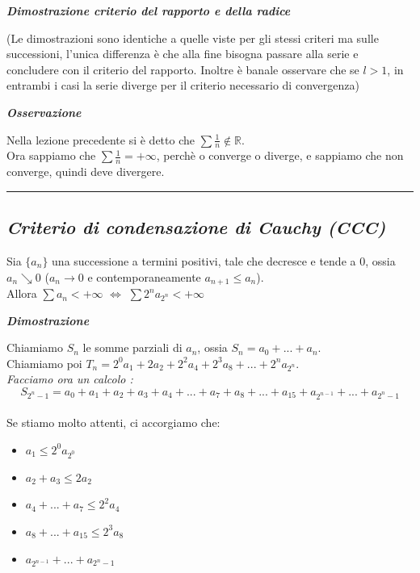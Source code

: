 \documentclass{article}
\theoremstyle{definition}
\newcommand{\R}{\mathbb{R}}
\begin{document}
\begin{center}
    \textbf{\textit{Dimostrazione criterio del rapporto e della radice}}
\end{center}
(Le dimostrazioni sono identiche a quelle viste per gli stessi criteri ma sulle successioni, l'unica differenza è che alla fine bisogna passare alla serie e concludere con il criterio del rapporto. Inoltre è banale osservare che se $l > 1$, in entrambi i casi la serie diverge per il criterio necessario di convergenza)
\\
\begin{center}
    \textbf{\textit{Osservazione}}
\end{center}
Nella lezione precedente si è detto che $\sum \frac{1}{n} \notin \R$.
\\
Ora sappiamo che $\sum \frac{1}{n} = +\infty$, perchè o converge o diverge, e sappiamo che non converge, quindi deve divergere.
\\
\vspace{15pt}
\hrule
\vspace{15pt}
\begin{center}
\subsection{\textbf{\textit{Criterio di condensazione di Cauchy (CCC)}}}
\end{center}
Sia $\{a_n\}$ una successione a termini positivi, tale che decresce e tende a 0, ossia $a_n \searrow 0$ ($a_n \to 0$ e contemporaneamente $a_{n+1} \leqslant a_n$).
\\
Allora $\sum a_n < +\infty \,\, \Longleftrightarrow \,\, \sum 2^na_{2^n} < +\infty$
\begin{center}
    \textbf{\textit{Dimostrazione}}
\end{center}
Chiamiamo $S_n$ le somme parziali di $a_n$, ossia $S_n=a_0+...+a_n$.
\\
Chiamiamo poi $T_n=2^0a_1+2a_2+2^2a_4+2^3a_8+...+2^na_{2^n}$.
\\
\textit{Facciamo ora un calcolo  :}\\
\[S_{2^{n}-1}= a_0+ a_1 + a_2 + a_3 +a_4 + ... + a_7+a_8+...+a_{15}+a_{2^{n-1}}+...+a_{2^n-1}\]
\\
Se stiamo molto attenti, ci accorgiamo che:
\begin{itemize}
    \item $a_1 \leqslant 2^0a_{2^0}$
    \item $a_2+ a_3 \leqslant 2a_2$
    \item $a_4+...+a_7 \leqslant 2^2a_4$
    \item $a_8+...+a_{15} \leqslant 2^3a_8$
    \item $a_{2^{n-1}}+...+a_{2^n-1}$
\end{itemize}
\end{document}
